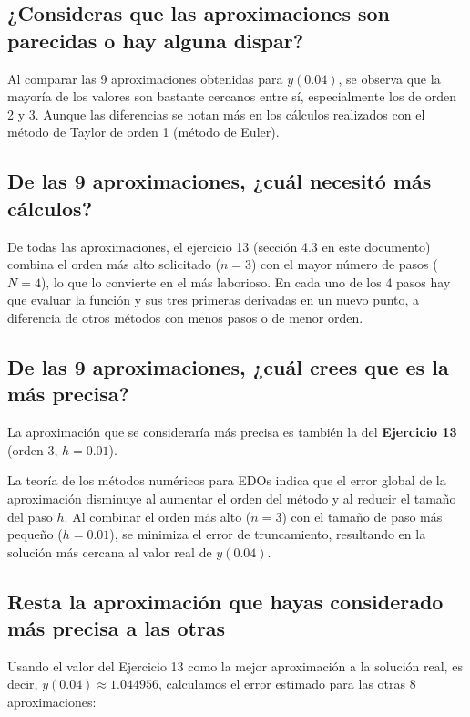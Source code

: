 \documentclass{article}
\begin{document}
\subsection{ ¿Consideras que las aproximaciones son parecidas o hay alguna dispar?}

Al comparar las 9 aproximaciones obtenidas para $y(0.04)$, se observa que la mayoría de los valores son bastante cercanos entre sí, especialmente los de orden 2 y 3. Aunque las diferencias se notan más en los cálculos realizados con el método de Taylor de orden 1 (método de Euler).

\subsection{De las 9 aproximaciones, ¿cuál necesitó más cálculos?}

De todas las aproximaciones, el ejercicio 13 (sección 4.3 en este documento) combina el orden más alto solicitado ($n=3$) con el mayor número de pasos ($N=4$), lo que lo convierte en el más laborioso. En cada uno de los 4 pasos hay que evaluar la función y sus tres primeras derivadas en un nuevo punto, a diferencia de otros métodos con menos pasos o de menor orden.

\subsection{De las 9 aproximaciones, ¿cuál crees que es la más precisa?}

La aproximación que se consideraría más precisa es también la del \textbf{Ejercicio 13} (orden 3, $h=0.01$).

La teoría de los métodos numéricos para EDOs indica que el error global de la aproximación disminuye al aumentar el orden del método y al reducir el tamaño del paso $h$. Al combinar el orden más alto ($n=3$) con el tamaño de paso más pequeño ($h=0.01$), se minimiza el error de truncamiento, resultando en la solución más cercana al valor real de $y(0.04)$.

\subsection{Resta la aproximación que hayas considerado más precisa a las otras}


Usando el valor del Ejercicio 13 como la mejor aproximación a la solución real, es decir, $y(0.04) \approx 1.044956$, calculamos el error estimado para las otras 8 aproximaciones:
\end{document}
